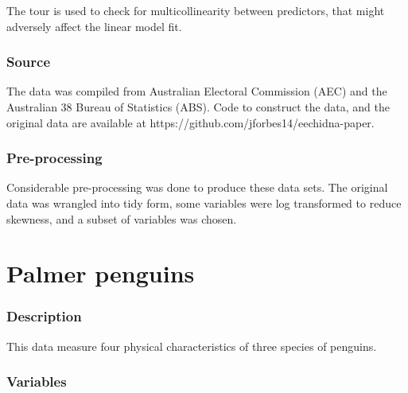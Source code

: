 \documentclass[
  letterpaper,
]{krantz}
\begin{document}
The tour is used to check for multicollinearity between predictors, that
might adversely affect the linear model fit.

\subsubsection*{Source}\label{source-2}

The data was compiled from Australian Electoral Commission (AEC) and the
Australian 38 Bureau of Statistics (ABS). Code to construct the data,
and the original data are available at
https://github.com/jforbes14/eechidna-paper.

\subsubsection*{Pre-processing}\label{pre-processing-2}

Considerable pre-processing was done to produce these data sets. The
original data was wrangled into tidy form, some variables were log
transformed to reduce skewness, and a subset of variables was chosen.

\section{Palmer penguins}\label{palmer-penguins}

\subsubsection*{Description}\label{description-3}

This data measure four physical characteristics of three species of
penguins.

\subsubsection*{Variables}\label{variables-3}
\end{document}
